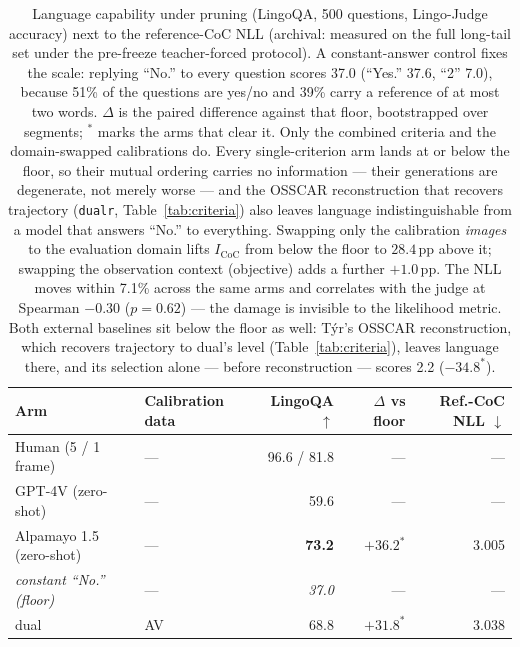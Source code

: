 \begin{table}[t]
\centering
\small
\setlength{\tabcolsep}{5pt}
\caption{%
  Language capability under pruning (LingoQA, 500 questions, Lingo-Judge accuracy)
  next to the reference-CoC NLL (archival: measured on the full long-tail set under
  the pre-freeze teacher-forced protocol). A constant-answer control fixes the scale:
  replying ``No.'' to every question scores 37.0 (``Yes.'' 37.6, ``2'' 7.0), because
  51\% of the questions are yes/no and 39\% carry a reference of at most two words.
  $\Delta$ is the paired difference against that floor, bootstrapped over segments;
  $^*$ marks the arms that clear it. Only the combined criteria and the
  domain-swapped calibrations do. Every single-criterion arm lands at or below the
  floor, so their mutual ordering carries no information --- their generations are
  degenerate, not merely worse --- and the OSSCAR reconstruction that recovers
  trajectory (\texttt{dualr}, Table~\ref{tab:criteria}) also leaves language
  indistinguishable from a model that answers ``No.'' to everything. Swapping only the
  calibration \emph{images} to the evaluation domain lifts $I_\mathrm{CoC}$ from below
  the floor to $28.4$\,pp above it; swapping the observation context (objective) adds
  a further $+1.0$\,pp. The NLL moves within 7.1\% across the same arms and correlates
  with the judge at Spearman $-0.30$ ($p{=}0.62$) --- the damage is invisible to the
  likelihood metric.
  Both external baselines sit below the floor as well: T\'yr's OSSCAR reconstruction,
  which recovers trajectory to dual's level (Table~\ref{tab:criteria}), leaves
  language there, and its selection alone --- before reconstruction --- scores 2.2
  ($-34.8^*$).
}
\label{tab:lingoqa}
\begin{tabular}{llrrr}
\toprule
Arm & Calibration data & LingoQA $\uparrow$ & $\Delta$ vs floor & Ref.-CoC NLL $\downarrow$ \\
\midrule
Human (5 / 1 frame)              & ---     & 96.6 / 81.8 & ---   & --- \\
GPT-4V (zero-shot)               & ---     & 59.6        & ---   & --- \\
Alpamayo 1.5 (zero-shot)         & ---     & \textbf{73.2} & $+36.2^*$ & 3.005 \\
\midrule
\emph{constant ``No.'' (floor)}  & ---     & \emph{37.0} & ---   & --- \\
\midrule
dual                             & AV      & 68.8 & $+31.8^*$ & 3.038 \\

\end{tabular}
\end{table}
